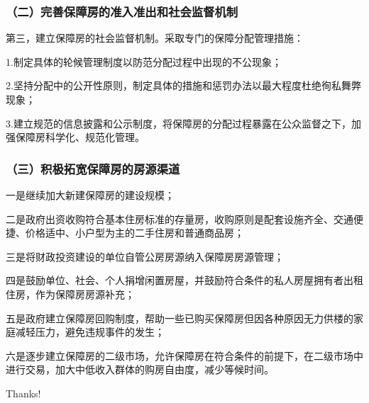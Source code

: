 \documentclass[aspectratio=169, 12pt]{beamer}
\begin{document}
\begin{frame}[plain]
    \frametitle{（二）完善保障房的准入准出和社会监督机制}
    第三，建立保障房的社会监督机制。采取专门的保障分配管理措施：
    \par
    1.制定具体的轮候管理制度以防范分配过程中出现的不公现象；
    \par
    2.坚持分配中的公开性原则，制定具体的措施和惩罚办法以最大程度杜绝徇私舞弊现象；
    \par
    3.建立规范的信息披露和公示制度，将保障房的分配过程暴露在公众监督之下，加强保障房科学化、规范化管理。
\end{frame}

\begin{frame}[plain]
    \frametitle{（三）积极拓宽保障房的房源渠道}
    一是继续加大新建保障房的建设规模；
    \par
    二是政府出资收购符合基本住房标准的存量房，收购原则是配套设施齐全、交通便捷、价格适中、小户型为主的二手住房和普通商品房；
    \par
    三是将财政投资建设的单位自管公房房源纳入保障房房源管理；
    \par
    四是鼓励单位、社会、个人捐增闲置房屋，并鼓励符合条件的私人房屋拥有者出租住房，作为保障房房源补充；
    \par
    五是政府建立保障房回购制度，帮助一些已购买保障房但因各种原因无力供楼的家庭减轻压力，避免违规事件的发生；
    \par
    六是逐步建立保障房的二级市场，允许保障房在符合条件的前提下，在二级市场中进行交易，加大中低收入群体的购房自由度，减少等候时间。
\end{frame}

\begin{frame}[standout]
    \begin{center}
        {\Huge\calligra Thanks!}
      \end{center}
\end{frame}
\end{document}
